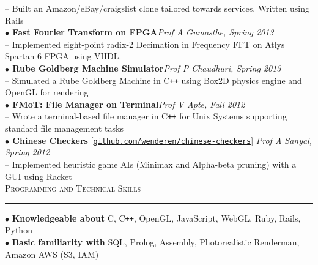\documentclass[a4paper,9pt]{article}
\begin{document}
-- Built an Amazon/eBay/craigslist clone tailored towards services. Written using Rails\\
\textbf{$\bullet$ Fast Fourier Transform on FPGA}\hfill \textit{Prof A Gumasthe, Spring 2013}\\
-- Implemented eight-point radix-2 Decimation in Frequency FFT on Atlys Spartan 6 FPGA using VHDL.\\
\textbf{$\bullet$ Rube Goldberg Machine Simulator}\hfill \textit{Prof P Chaudhuri, Spring 2013}\\
-- Simulated a Rube Goldberg Machine in C\verb!++! using Box2D physics engine and OpenGL for rendering\\
\textbf{$\bullet$ FMoT: File Manager on Terminal}\hfill \textit{Prof V Apte, Fall 2012}\\
-- Wrote a terminal-based file manager in C\texttt{++} for Unix Systems supporting standard file management tasks\\
\textbf{$\bullet$ Chinese Checkers} [\href{https://github.com/wenderen/chinese-checkers}{\texttt{github.com/wenderen/chinese-checkers}}] \hfill \textit{Prof A Sanyal, Spring 2012}\\
-- Implemented heuristic game AIs (Minimax and Alpha-beta pruning) with a GUI using Racket\\

\Large{\textsc{Programming and Technical Skills}}\vspace{1.5pt}
\hrule\vspace{0.25cm}
\normalsize
$\bullet$ \textbf{Knowledgeable about} C, C\verb!++!, OpenGL, JavaScript, WebGL, Ruby, Rails, Python\\
$\bullet$ \textbf{Basic familiarity with} SQL, Prolog, Assembly, Photorealistic Renderman, Amazon AWS (S3, IAM)\\
\end{document}

